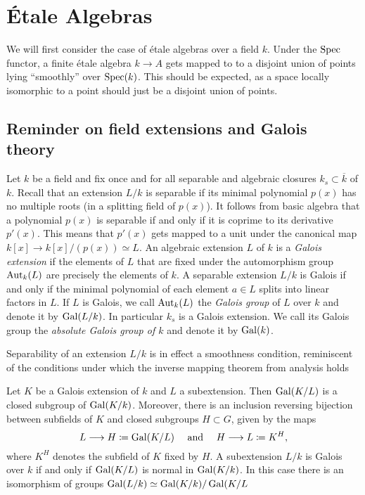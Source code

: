 \section{\'Etale Algebras}
We will first consider the case of \'etale algebras over a field $k$. Under the $\operatorname{Spec}$ functor, a finite \'etale algebra $k \to A$ gets mapped to to a disjoint union of points lying ``smoothly'' over $\operatorname{Spec}(k)$. This should be expected, as a space locally isomorphic to a point should just be a disjoint union of points.

\subsection{Reminder on field extensions and Galois theory}
\begin{construction}
	Let $k$ be a field and fix once and for all separable and algebraic closures $k_s \subset \overline{k}$ of $k$. Recall that an extension $L/k$ is separable if its minimal polynomial $p(x)$ has no multiple roots (in a splitting field of $p(x)$). It follows from basic algebra that a polynomial $p(x)$ is separable if and only if it is coprime to its derivative $p'(x)$. This means that $p'(x)$ gets mapped to a unit under the canonical map $k[x] \to k[x]/(p(x)) \simeq L$. An algebraic extension $L$ of $k$ is a \textit{Galois extension} if the elements of $L$ that are fixed under the automorphism group $\operatorname{Aut}_k(L)$ are precisely the elements of $k$. A separable extension $L/k$ is Galois if and only if the minimal polynomial of each element $a \in L$ splits into linear factors in $L$. If $L$ is Galois, we call $\operatorname{Aut}_k(L)$ the \textit{Galois group} of $L$ over $k$ and denote it by $\operatorname{Gal}(L/k)$. In particular $k_s$ is a Galois extension. We call its Galois group the \textit{absolute Galois group of $k$} and denote it by $\operatorname{Gal}(k)$.
\end{construction}


\begin{remark}
	Separability of an extension $L/k$ is in effect a smoothness condition, reminiscent of the conditions under which the inverse mapping theorem from analysis holds
\end{remark}

\begin{theorem}\label{theorem:galois}
	Let $K$ be a Galois extension of $k$ and $L$ a subextension. Then $\operatorname{Gal}(K/L)$ is a closed subgroup of $\operatorname{Gal}(K/k)$. Moreover, there is an inclusion reversing bijection between subfields of $K$ and closed subgroups $H \subset G$, given by the maps
	\[
		L \longrightarrow H \coloneqq \operatorname{Gal}(K/L) \quad \text{ and } \quad H \longrightarrow L \coloneqq K^H,
	\]
	where $K^H$ denotes the subfield of $K$ fixed by $H$. A subextension $L/k$ is Galois over $k$ if and only if $\operatorname{Gal}(K/L)$ is normal in $\operatorname{Gal}(K/k)$. In this case there is an isomorphism of groups $\operatorname{Gal}(L/k) \simeq \operatorname{Gal}(K/k)/\operatorname{Gal}(K/L$
\end{theorem}

